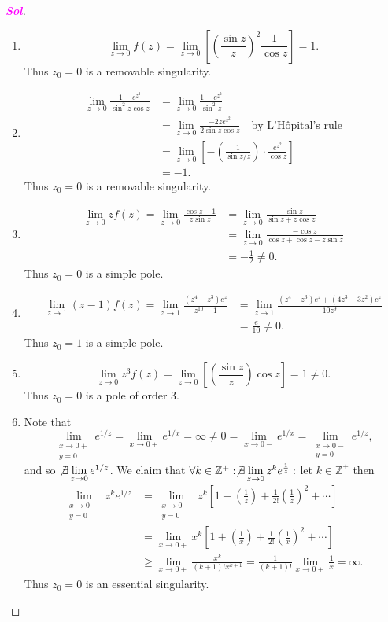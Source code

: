 \documentclass{article}
\theoremstyle{definition}
\newcommand{\Z}{\mathbb{Z}}
\newcommand{\of}[1]{\left( #1 \right)}
\newcommand{\sol}{\textcolor{magenta}{\bf Sol}}
\begin{document}
	\begin{proof}[\sol]
		\begin{enumerate}[(1)]
			\item \[
			\lim\limits_{z\to 0}f(z)=\lim\limits_{z\to 0}\left[\of{\frac{\sin z}{z}}^2\frac{1}{\cos z}\right]=1.
			\] Thus $z_0=0$ is a removable singularity.
			\item \begin{align*}
			\lim\limits_{z\to 0}\frac{1-e^{z^2}}{\sin^2z\cos z}&=\lim\limits_{z\to 0}\frac{1-e^{z^2}}{\sin^2z}\\
			&=\lim\limits_{z\to 0}\frac{-2ze^{z^2}}{2\sin z\cos z}\quad\text{by L'Hôpital's rule}\\
			&=\lim\limits_{z\to 0}\left[-\of{\frac{1}{\sin z/z}}\cdot\frac{e^{z^2}}{\cos z}\right]\\
			&=-1.
			\end{align*}
			Thus $z_0=0$ is a removable singularity.
			\item \begin{align*}
			\lim\limits_{z\to 0}zf(z)=\lim\limits_{z\to 0}\frac{\cos z-1}{z\sin z}&=\lim\limits_{z\to 0}\frac{-\sin z}{\sin z+z\cos z}\\
			&=\lim\limits_{z\to 0}\frac{-\cos z}{\cos z+\cos z-z\sin z}\\
			&=-\frac{1}{2}\neq 0.
			\end{align*} Thus $z_0=0$ is a simple pole.
			\item \begin{align*}
			\lim\limits_{z\to 1}(z-1)f(z)=\lim\limits_{z\to 1}\frac{(z^4-z^3)e^z}{z^{10}-1}&=\lim\limits_{z\to 1}\frac{(z^4-z^3)e^z+(4z^3-3z^2)e^z}{10z^{9}}\\
			&=\frac{e}{10}\neq 0.
			\end{align*} Thus $z_0=1$ is a simple pole.
			\item \[
			\lim\limits_{z\to 0}z^3f(z)=\lim\limits_{z\to 0}\left[\of{\frac{\sin z}{z}}{\cos z}\right]=1\neq 0.
			\] Thus $z_0=0$ is a pole of order $3$.
			\item Note that \[
			\lim\limits_{\substack{x\to 0+\\ y=0}}e^{1/z}=\lim\limits_{x\to 0+}e^{1/x}=\infty\neq 0=\lim\limits_{x\to 0-}e^{1/x}=\lim\limits_{\substack{x\to 0-\\ y=0}}e^{1/z},
			\] and so $\not\exists\lim\limits_{z\to 0}e^{1/z}$. We claim that
			$\forall k\in\Z^+:\not\exists\lim\limits_{z\to 0} z^ke^{\frac{1}{z}}:$ let $k\in\Z^+$ then
			\begin{align*}
			\lim\limits_{\substack{x\to 0+\\ y=0}}z^ke^{1/z}&=\lim\limits_{\substack{x\to 0+\\ y=0}}z^k\left[1+\of{\frac{1}{z}}+\frac{1}{2!}\of{\frac{1}{z}}^2+\cdots\right]\\
			&=\lim\limits_{x\to 0+}x^k\left[1+\of{\frac{1}{x}}+\frac{1}{2!}\of{\frac{1}{x}}^2+\cdots\right]\\
			&\geq\lim\limits_{x\to 0+}\frac{x^k}{(k+1)!x^{k+1}}=\frac{1}{(k+1)!}\lim\limits_{x\to 0+}\frac{1}{x}=\infty.
			\end{align*} Thus $z_0=0$ is an essential singularity.
		\end{enumerate}
	\end{proof}
\end{document}
